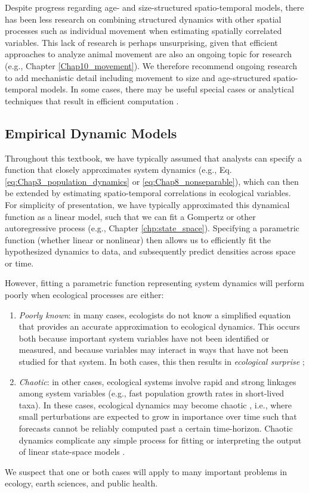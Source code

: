 Despite progress regarding age- and size-structured spatio-temporal models, there has been less research on combining structured dynamics with other spatial processes such as individual movement when estimating spatially correlated variables.  This lack of research is perhaps unsurprising, given that efficient approaches to analyze animal movement are also an ongoing topic for research (e.g., Chapter \ref{Chap10_movement}).  We therefore recommend ongoing research to add mechanistic detail including movement to size and age-structured spatio-temporal models.  In some cases, there may be useful special cases or analytical techniques that result in efficient computation \cite{lindgren_diffusion-based_2023}.  

\subsection{Empirical Dynamic Models}
Throughout this textbook, we have typically assumed that analysts can specify a function that closely approximates system dynamics (e.g., Eq. \ref{eq:Chap3_population_dynamics} or \ref{eq:Chap8_nonseparable}), which can then be extended by estimating spatio-temporal correlations in ecological variables.  For simplicity of presentation, we have typically approximated this dynamical function as a linear model, such that we can fit a Gompertz or other autoregressive process (e.g., Chapter \ref{chp:state_space}).  Specifying a parametric function (whether linear or nonlinear) then allows us to efficiently fit the hypothesized dynamics to data, and subsequently predict densities across space or time.  

However, fitting a parametric function representing system dynamics will perform poorly when ecological processes are either:
\begin{enumerate}
    \item \textit{Poorly known}:  in many cases, ecologists do not know a simplified equation that provides an accurate approximation to ecological dynamics.  This occurs both because important system variables have not been identified or measured, and because variables may interact in ways that have not been studied for that system.  In both cases, this then results in \textit{ecological surprise} \cite{doak_understanding_2008};

    \item \textit{Chaotic}:  in other cases, ecological systems involve rapid and strong linkages among system variables (e.g., fast population growth rates in short-lived taxa).  In these cases, ecological dynamics may become chaotic \cite{rogers_chaos_2022}, i.e., where small perturbations are expected to grow in importance over time such that forecasts cannot be reliably computed past a certain time-horizon.  Chaotic dynamics complicate any simple process for fitting or interpreting the output of linear state-space models \cite{perretti_model-free_2013}.
\end{enumerate}
We suspect that one or both cases will apply to many important problems in ecology, earth sciences, and public health.  


